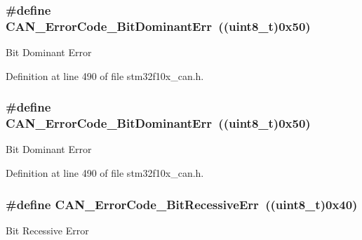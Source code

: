 \subsubsection[{\texorpdfstring{C\+A\+N\+\_\+\+Error\+Code\+\_\+\+Bit\+Dominant\+Err}{CAN_ErrorCode_BitDominantErr}}]{\setlength{\rightskip}{0pt plus 5cm}\#define C\+A\+N\+\_\+\+Error\+Code\+\_\+\+Bit\+Dominant\+Err~(({\bf uint8\+\_\+t})0x50)}\hypertarget{group___c_a_n___error___code__constants_gaa19708aa85d1a34f8f7f25a2bfe88b19}{}\label{group___c_a_n___error___code__constants_gaa19708aa85d1a34f8f7f25a2bfe88b19}
Bit Dominant Error 

Definition at line 490 of file stm32f10x\+\_\+can.\+h.

\subsubsection[{\texorpdfstring{C\+A\+N\+\_\+\+Error\+Code\+\_\+\+Bit\+Dominant\+Err}{CAN_ErrorCode_BitDominantErr}}]{\setlength{\rightskip}{0pt plus 5cm}\#define C\+A\+N\+\_\+\+Error\+Code\+\_\+\+Bit\+Dominant\+Err~(({\bf uint8\+\_\+t})0x50)}\hypertarget{group___c_a_n___error___code__constants_gaa19708aa85d1a34f8f7f25a2bfe88b19}{}\label{group___c_a_n___error___code__constants_gaa19708aa85d1a34f8f7f25a2bfe88b19}
Bit Dominant Error 

Definition at line 490 of file stm32f10x\+\_\+can.\+h.

\subsubsection[{\texorpdfstring{C\+A\+N\+\_\+\+Error\+Code\+\_\+\+Bit\+Recessive\+Err}{CAN_ErrorCode_BitRecessiveErr}}]{\setlength{\rightskip}{0pt plus 5cm}\#define C\+A\+N\+\_\+\+Error\+Code\+\_\+\+Bit\+Recessive\+Err~(({\bf uint8\+\_\+t})0x40)}\hypertarget{group___c_a_n___error___code__constants_gaf800de7683f1d22194e1df8eb3b1c5bb}{}\label{group___c_a_n___error___code__constants_gaf800de7683f1d22194e1df8eb3b1c5bb}
Bit Recessive Error 

